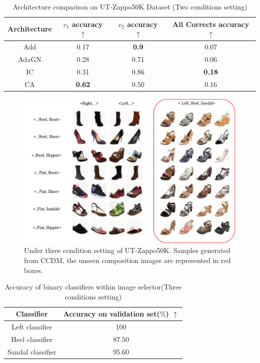 \begin{table} [H]
    \centering
    \begin{tabular}{c|ccc}
         Architecture & $c_1$ accuracy $\uparrow$ & $c_2$ accuracy $\uparrow$ & All Corrects accuracy $\uparrow$ \\
         \hline
         Add & 0.17 & \textbf{0.9} & 0.07\\
         AdaGN & 0.28 & 0.71 & 0.06 \\
         IC & 0.31 & 0.86 & \textbf{0.18} \\
         CA & \textbf{0.62} & 0.50 & 0.16 \\
    \end{tabular}
    \caption{Architecture comparison on UT-Zappo50K Dataset (Two conditions setting)}
    \label{tab:Zappo50KAcc}
\end{table}


\begin{figure} [H]
    \centering
    \includegraphics[width=1\linewidth]{figures/Zappo2.pdf}
    \caption{Under three condition setting of UT-Zappo50K. Samples generated from CCDM, the unseen composition images are represented in red boxes.}
    \label{fig:sample_8}
\end{figure}

\begin{table} [H]
    \centering
    \begin{tabular}{cc}
         Classifier & Accuracy on validation set($\%$) $\uparrow$ \\
         \hline
         Left classifier & 100 \\
         Heel classifier & 87.50 \\
         Sandal classifier & 95.60 \\
    \end{tabular}
    \caption{Accuracy of binary classifiers within image selector(Three conditions setting)}
    \label{ZappoBinAccTri}
\end{table}

